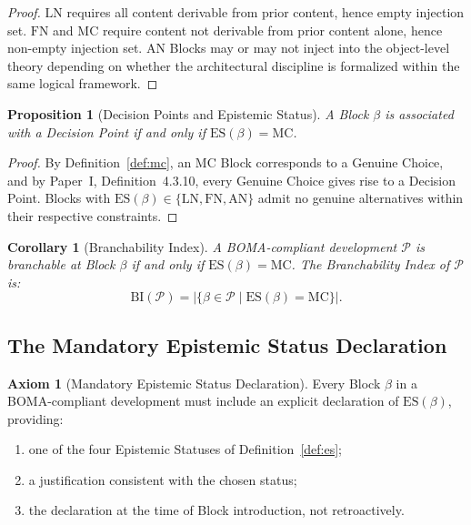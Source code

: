 \documentclass[12pt, a4paper]{article}
\theoremstyle{plain}
\newtheorem{proposition}[theorem]{Proposition}
\newtheorem{corollary}[theorem]{Corollary}
\theoremstyle{definition}
\newtheorem{axiom}[theorem]{Axiom}
\theoremstyle{remark}
\newcommand{\BOMA}{\textsf{BOMA}}
\newcommand{\ES}[1]{\mathrm{ES}(#1)}
\newcommand{\BI}[1]{\mathrm{BI}(#1)}
\newcommand{\LN}{\mathrm{LN}}
\newcommand{\FN}{\mathrm{FN}}
\newcommand{\AN}{\mathrm{AN}}
\newcommand{\MC}{\mathrm{MC}}
\begin{document}
\begin{proof}
$\LN$ requires all content derivable from prior content, hence empty
injection set. $\FN$ and $\MC$ require content not derivable from
prior content alone, hence non-empty injection set. $\AN$ Blocks
may or may not inject into the object-level theory depending on
whether the architectural discipline is formalized within the same
logical framework.
\end{proof}

\begin{proposition}[Decision Points and Epistemic Status]
\label{prop:es-dp}
A Block $\beta$ is associated with a Decision Point if and only if
$\ES{\beta} = \MC$.
\end{proposition}

\begin{proof}
By Definition~\ref{def:mc}, an $\MC$ Block corresponds to a Genuine
Choice, and by Paper~I, Definition~4.3.10, every Genuine Choice gives
rise to a Decision Point. Blocks with $\ES{\beta} \in \{\LN,\FN,\AN\}$
admit no genuine alternatives within their respective constraints.
\end{proof}

\begin{corollary}[Branchability Index]
\label{cor:bi}
A \BOMA{}-compliant development $\mathcal{P}$ is branchable at Block
$\beta$ if and only if $\ES{\beta} = \MC$. The \emph{Branchability
Index} of $\mathcal{P}$ is:
\[
  \BI{\mathcal{P}}
  = |\{\beta \in \mathcal{P} \mid \ES{\beta} = \MC\}|.
\]
\end{corollary}

\subsection{The Mandatory Epistemic Status Declaration}
\label{subsec:ep-declaration}

\begin{axiom}[Mandatory Epistemic Status Declaration]
\label{ax:es}
Every Block $\beta$ in a \BOMA{}-compliant development must include
an explicit declaration of $\ES{\beta}$, providing:
\begin{enumerate}
  \item one of the four Epistemic Statuses of
        Definition~\ref{def:es};
  \item a justification consistent with the chosen status;
  \item the declaration at the time of Block introduction,
        not retroactively.
\end{enumerate}
\end{axiom}
\end{document}
